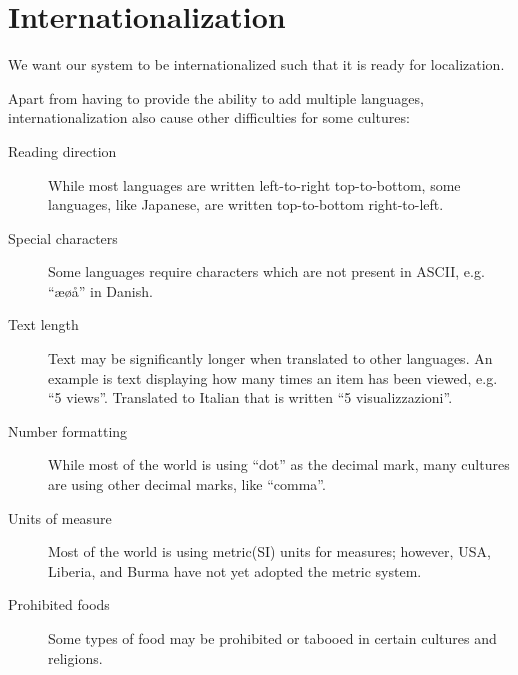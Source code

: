 \section{Internationalization}
We want our system to be internationalized such that it is ready for localization.

Apart from having to provide the ability to add multiple languages, internationalization also cause other difficulties for some cultures:

\begin{description}
  \item[Reading direction] While most languages are written left-to-right top-to-bottom, some languages, like Japanese, are written top-to-bottom right-to-left.
  \item[Special characters] Some languages require characters which are not present in ASCII, e.g. ``æøå'' in Danish.
  \item[Text length] Text may be significantly longer when translated to other languages. An example is text displaying how many times an item has been viewed, e.g. ``5 views''. Translated to Italian that is written ``5 visualizzazioni''.\cite{wordlength}
  \item[Number formatting] While most of the world is using ``dot'' as the decimal mark, many cultures are using other decimal marks, like ``comma''.
  \item[Units of measure] Most of the world is using metric(SI) units for measures; however, USA, Liberia, and Burma have not yet adopted the metric system.\cite{unitsfactbook}
  \item[Prohibited foods] Some types of food may be prohibited or tabooed in certain cultures and religions.
\end{description}